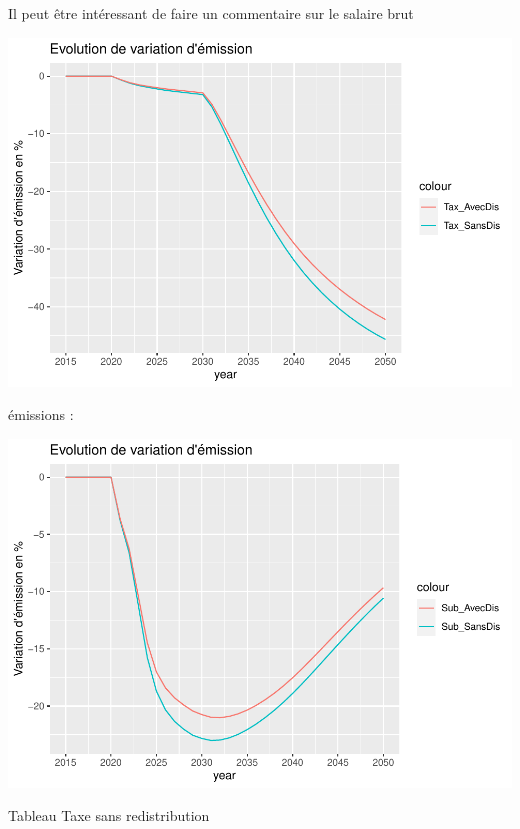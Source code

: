 \documentclass[
]{article}
\begin{document}
Il peut être intéressant de faire un commentaire sur le salaire brut

\includegraphics{Modele-ThreeMe-Tunisie_Sequeira_Valilou_Wang_files/figure-latex/unnamed-chunk-13-1.pdf}

émissions :

\includegraphics{Modele-ThreeMe-Tunisie_Sequeira_Valilou_Wang_files/figure-latex/unnamed-chunk-14-1.pdf}

Tableau Taxe sans redistribution
\end{document}
